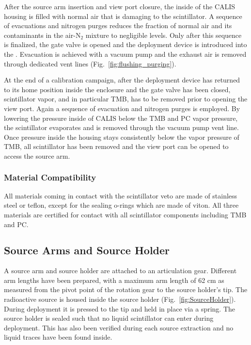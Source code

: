 After the source arm insertion and view port closure, the inside of the CALIS housing is filled with normal air that is damaging to the scintillator. A sequence of evacuations and nitrogen purges reduces the fraction of normal air and its contaminants in the air-N$_2$ mixture to negligible levels. Only after this sequence is finalized, the gate valve is opened and the deployment device is introduced into the \lsv. Evacuation is achieved with a vacuum pump and the exhaust air is removed through dedicated vent lines (Fig.~\ref{fig:flushing_purging}).

At the end of a calibration campaign, after the deployment device has returned to its home position inside the enclosure and the gate valve has been closed, scintillator vapor, and in particular TMB, has to be removed prior to opening the view port. Again a sequence of evacuation and nitrogen purges is employed. By lowering the pressure inside of CALIS below the TMB and PC vapor pressure, the scintillator evaporates and is removed through the vacuum pump vent line. Once pressure inside the housing stays consistently below the vapor pressure of TMB, all scintillator has been removed and the view port can be opened to access the source arm.
 
\subsubsection*{Material Compatibility}
All materials coming in contact with the scintillator veto are made of stainless steel or teflon, except for the sealing o-rings which are made of viton. All three materials are certified for contact with all scintillator components including TMB and PC.

\subsection{Source Arms and Source Holder}
A source arm and source holder are attached to an articulation gear. Different arm lengths have been prepared, with a maximum arm length of 62 cm as measured from the pivot point of the rotation gear to the source holder's tip. The radioactive source is housed inside the source holder (Fig.~\ref{fig:SourceHolder}). During deployment it is pressed to the tip and held in place via a spring. The source holder is sealed such that no liquid scintillator can enter during deployment. This has also been verified during each source extraction and no liquid traces have been found inside.

